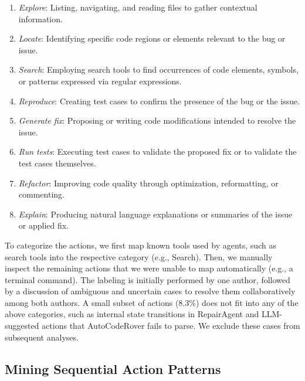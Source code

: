 \documentclass[conference,10pt]{IEEEtran}
\theoremstyle{definition}        %
\newcommand{\ra}{Repair\-Agent}
\newcommand{\acr}{Auto\-Code\-Rover}
\begin{document}
\begin{enumerate}
    \item \emph{Explore}: Listing, navigating, and reading files to gather contextual information.
	\item \emph{Locate}: Identifying specific code regions or elements relevant to the bug or issue.
	\item \emph{Search}: Employing search tools to find occurrences of code elements, symbols, or patterns expressed via regular expressions.
    \item \emph{Reproduce}: Creating test cases to confirm the presence of the bug or the issue.
 	\item \emph{Generate fix}: Proposing or writing code modifications intended to resolve the issue.
    \item \emph{Run tests}: Executing test cases to validate the proposed fix or to validate the test cases themselves.
    \item \emph{Refactor}: Improving code quality through optimization, reformatting, or commenting.
    \item \emph{Explain}: Producing natural language explanations or summaries of the issue or applied fix.
\end{enumerate}


To categorize the actions, we first map known tools used by agents, such as search tools into the respective category (e.g., Search). Then, we manually inspect the remaining actions that we were unable to map automatically (e.g., a terminal command).
The labeling is initially performed by one author, followed by a discussion of ambiguous and uncertain cases to resolve them collaboratively among both authors.
A small subset of actions (8.3\%) does not fit into any of the above categories, such as internal state transitions in \ra{} and LLM-suggested actions that \acr{} fails to parse.
We exclude these cases from subsequent analyses. 




\subsection{Mining Sequential Action Patterns}
\end{document}
